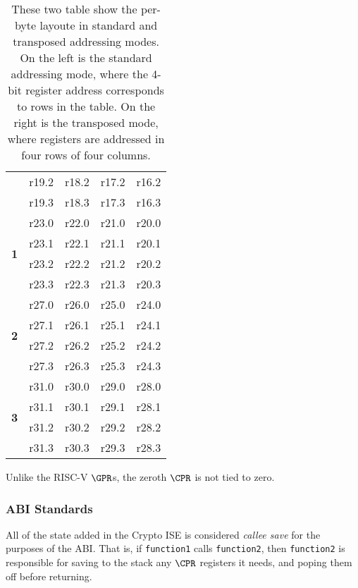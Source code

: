 \begin{table}[h!]
\begin{tabular}{|l|l|l|l|l|}
                            & r19.2   & r18.2   & r17.2   & r16.2   \\
                            & r19.3   & r18.3   & r17.3   & r16.3   \\ \hline
\multirow{4}{*}{\textbf{1}} & r23.0   & r22.0   & r21.0   & r20.0   \\
                            & r23.1   & r22.1   & r21.1   & r20.1   \\
                            & r23.2   & r22.2   & r21.2   & r20.2   \\
                            & r23.3   & r22.3   & r21.3   & r20.3   \\ \hline
\multirow{4}{*}{\textbf{2}} & r27.0   & r26.0   & r25.0   & r24.0   \\
                            & r27.1   & r26.1   & r25.1   & r24.1   \\
                            & r27.2   & r26.2   & r25.2   & r24.2   \\
                            & r27.3   & r26.3   & r25.3   & r24.3   \\ \hline
\multirow{4}{*}{\textbf{3}} & r31.0   & r30.0   & r29.0   & r28.0   \\
                            & r31.1   & r30.1   & r29.1   & r28.1   \\
                            & r31.2   & r30.2   & r29.2   & r28.2   \\
                            & r31.3   & r30.3   & r29.3   & r28.3   \\ \hline
\end{tabular}
\caption{These two table show the per-byte layoute in standard and transposed
addressing modes. On the left is the standard addressing mode, where the
4-bit register address corresponds to rows in the table. On the right
is the transposed mode, where registers are addressed in four rows of
four columns.}
\label{tab:state-addr}
\end{table}

Unlike the RISC-V $\GPR$s, the zeroth $\CPR$ is not tied to zero.


\subsubsection{ABI Standards}

All of the state added in the Crypto ISE is considered {\em callee save}
for the purposes of the ABI. That is, if {\tt function1} calls 
{\tt function2}, then {\tt function2} is responsible for saving to the
stack any $\CPR$ registers it needs, and poping them off before returning.

